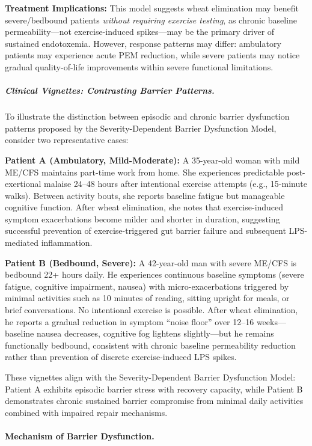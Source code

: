 \begin{speculation}
\textbf{Treatment Implications:}
This model suggests wheat elimination may benefit severe/bedbound patients \textit{without requiring exercise testing}, as chronic baseline permeability---not exercise-induced spikes---may be the primary driver of sustained endotoxemia. However, response patterns may differ: ambulatory patients may experience acute PEM reduction, while severe patients may notice gradual quality-of-life improvements within severe functional limitations.
\end{speculation}

\subparagraph{Clinical Vignettes: Contrasting Barrier Patterns.}

To illustrate the distinction between episodic and chronic barrier dysfunction patterns proposed by the Severity-Dependent Barrier Dysfunction Model, consider two representative cases:

\textbf{Patient A (Ambulatory, Mild-Moderate):} A 35-year-old woman with mild ME/CFS maintains part-time work from home. She experiences predictable post-exertional malaise 24--48 hours after intentional exercise attempts (e.g., 15-minute walks). Between activity bouts, she reports baseline fatigue but manageable cognitive function. After wheat elimination, she notes that exercise-induced symptom exacerbations become milder and shorter in duration, suggesting successful prevention of exercise-triggered gut barrier failure and subsequent LPS-mediated inflammation.

\textbf{Patient B (Bedbound, Severe):} A 42-year-old man with severe ME/CFS is bedbound 22+ hours daily. He experiences continuous baseline symptoms (severe fatigue, cognitive impairment, nausea) with micro-exacerbations triggered by minimal activities such as 10 minutes of reading, sitting upright for meals, or brief conversations. No intentional exercise is possible. After wheat elimination, he reports a gradual reduction in symptom ``noise floor'' over 12--16 weeks---baseline nausea decreases, cognitive fog lightens slightly---but he remains functionally bedbound, consistent with chronic baseline permeability reduction rather than prevention of discrete exercise-induced LPS spikes.

These vignettes align with the Severity-Dependent Barrier Dysfunction Model: Patient A exhibits episodic barrier stress with recovery capacity, while Patient B demonstrates chronic sustained barrier compromise from minimal daily activities combined with impaired repair mechanisms.

\paragraph{Mechanism of Barrier Dysfunction.}

